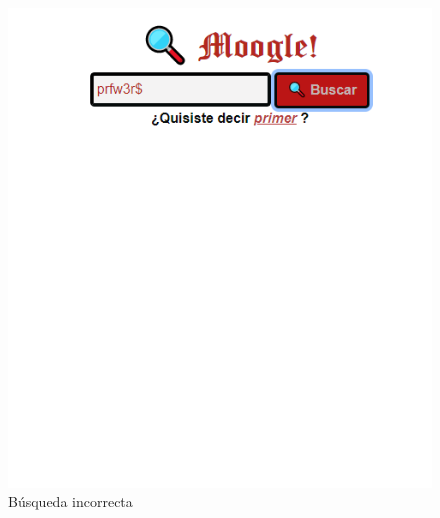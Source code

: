 \documentclass[a4paper,12pt]{article}
\begin{document}
 \begin{figure}[h]
    \center
    \includegraphics[width=12cm]{incorrecta.jpg}
    \caption{Búsqueda incorrecta}
 \end{figure}
\end{document}
